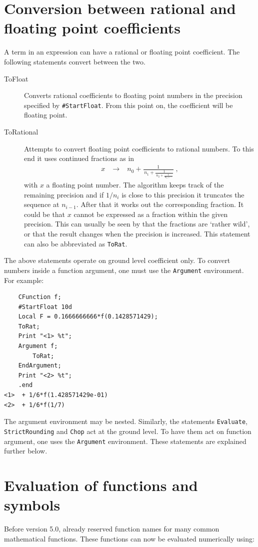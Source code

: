 \section{Conversion between rational and floating point coefficients}
A term in an expression can have a rational or floating point coefficient. 
The following statements convert between the two.
\begin{description}
\item[ToFloat] Converts rational coefficients to 
floating point numbers in the precision specified by \texttt{\#StartFloat}. 
From this point on, the coefficient will be floating point. 
\item[ToRational] Attempts to convert floating point coefficients to 
rational numbers. To this end it uses continued fractions as in
\begin{eqnarray}
	x & \;\rightarrow\; & n_0 + \frac{1}{\,n_1 + \frac{1}{\,n_2 + \frac{1}{\,n_3 + \cdots}}}\;,
	\nonumber
\end{eqnarray}
with $x$ a floating point number. The algorithm keeps track of the 
remaining precision and if $1/n_i$ is close to this precision it truncates 
the sequence at $n_{i-1}$. After that it works out the corresponding fraction. 
It could be that $x$ cannot be expressed as a fraction within the given precision. 
This can usually be seen by that the fractions are `rather wild', or that 
the result changes when the precision is increased. This statement can also 
be abbreviated as \texttt{ToRat}.
\end{description}

The above statements operate on ground level coefficient only. To convert numbers 
inside a function argument, one must use the \texttt{Argument} environment. 
For example: 
\begin{verbatim}
    CFunction f;
    #StartFloat 10d
    Local F = 0.1666666666*f(0.1428571429);
    ToRat;
    Print "<1> %t";
    Argument f;
        ToRat;
    EndArgument;
    Print "<2> %t";
    .end
<1>  + 1/6*f(1.428571429e-01)
<2>  + 1/6*f(1/7)
\end{verbatim}
The argument environment may be nested.
Similarly, the statements \texttt{Evaluate}, \texttt{StrictRounding} and \texttt{Chop} act at
the ground level. To have them act on function argument, one uses the \texttt{Argument} environment.
These statements are explained further below. 

\section{Evaluation of functions and symbols}
Before version 5.0, \FORM{} already reserved function names for many common mathematical
functions. These functions can now be evaluated numerically using:

